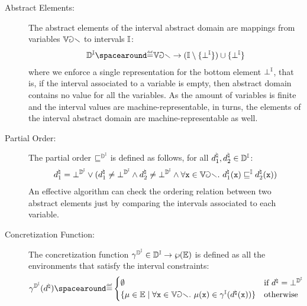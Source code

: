   \begin{description}
    \item[Abstract Elements:] The abstract elements of the interval abstract domain are mappings from variables $\mathbb{Var}$ to intervals $\mathbb{I}$:
    \begin{align*}
      \intervalabstractdomaintype \DefeQ \variables \to (\intervaltype \setminus \{\intervalbottom\}) \setjoin \{\intervalbottom\}
    \end{align*}
    where we enforce a single representation for the bottom element $\bot^{\mathbb{I}}$, that is, if the interval associated to a variable is empty, then abstract domain contains no value for all the variables.
    As the amount of variables is finite and the interval values are machine-representable, in turns, the elements of the interval abstract domain are machine-representable as well.
    \item[Partial Order:] The partial order $\sqsubseteq^{\mathbb{D}^{\mathbb{I}}}$ is defined as follows, for all $d^\natural_1, d^\natural_2 \in \mathbb{D}^{\mathbb{I}}$:
    \begin{align*}
      d^\natural_1 = \bot^{\mathbb{D}^{\mathbb{I}}} \lor (d^\natural_1 \neq \bot^{\mathbb{D}^{\mathbb{I}}} \land d^\natural_2 \neq \bot^{\mathbb{D}^{\mathbb{I}}} \land \forall \textup{\texttt{x}} \in \mathbb{Var}.~ d^\natural_1(\textup{\texttt{x}}) \sqsubseteq^{\mathbb{I}} d^\natural_2(\textup{\texttt{x}}))
    \end{align*}
    An effective algorithm can check the ordering relation between two abstract elements just by comparing the intervals associated to each variable.
    \item[Concretization Function:] The concretization function $\gamma^{\mathbb{D}^{\mathbb{I}}}\in\mathbb{D}^{\mathbb{I}}\to\wp(\mathbb{E})$ is defined as all the environments that satisfy the interval constraints:
    \begin{align*}
      \intervalabstractdomainconcretization(\defabstractvalue) \DefeQ \begin{cases}
        \emptyset & \text{if } \defabstractvalue = \intervalabstractdomainbottom \\
        \setdef{\defenv\in\env}{\forall \defvariable \in \variables.\spacer \defenv(\defvariable) \in \intervalconcretization(\defabstractvalue(\defvariable))} & \text{otherwise}
      \end{cases}
    \end{align*}

\end{description}
